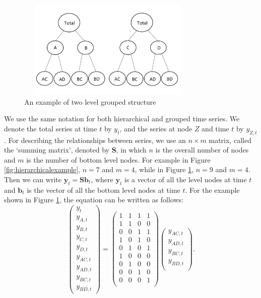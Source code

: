 \documentclass[11pt,a4paper,]{article}
\begin{document}
\begin{figure}

{\centering \includegraphics[width=330px,height=180px]{hcf_files/figure-latex/groupexample-1} 

}

\caption{An example of two level grouped structure}\label{fig:groupexample}
\end{figure}

We use the same notation \autocite[following][]{fpp2} for both hierarchical and grouped time series. We denote the total series at time \(t\) by \(y_t\), and the series at node \(Z\) and time \(t\) by \(y_{Z,t}\). For describing the relationships between series, we use an \(n\times m\) matrix, called the `summing matrix', denoted by \(\bm{S}\), in which \(n\) is the overall number of nodes and \(m\) is the number of bottom level nodes. For example in Figure \ref{fig:hierarchicalexample}, \(n = 7\) and \(m = 4\), while in Figure \ref{fig:groupexample}, \(n=9\) and \(m=4\). Then we can write \(\bm{y}_t=\bm{S}\bm{b}_t\), where \(\bm{y}_t\) is a vector of all the level nodes at time \(t\) and \(\bm{b}_t\) is the vector of all the bottom level nodes at time \(t\). For the example shown in Figure \ref{fig:groupexample}, the equation can be written as follows:
\begin{equation}\label{eq:Smatrixexample}
\begin{pmatrix}
  y_{t}\\y_{A,t}\\y_{B,t}\\y_{C,t}\\y_{D,t}\\y_{AC,t}\\y_{AD,t}\\y_{BC,t}\\y_{BD,t}
\end{pmatrix} =
\begin{pmatrix}
  1&1&1&1\\1&1&0&0\\0&0&1&1\\1&0&1&0\\0&1&0&1\\1&0&0&0\\0&1&0&0\\0&0&1&0\\0&0&0&1\\
\end{pmatrix}
\begin{pmatrix}
  y_{AC,t}\\y_{AD,t}\\y_{BC,t}\\y_{BD,t}\\
\end{pmatrix}.
\end{equation}
\end{document}
